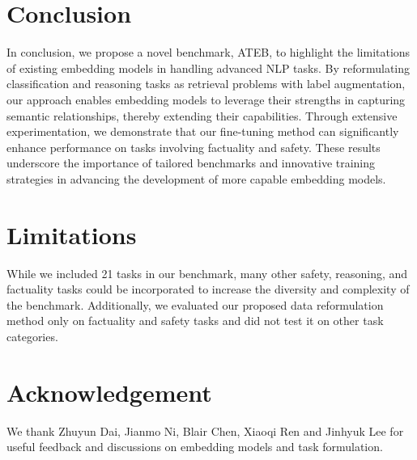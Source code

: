 
\section{Conclusion} In conclusion, we propose a novel benchmark, ATEB, to highlight the limitations of existing embedding models in handling advanced NLP tasks. By reformulating classification and reasoning tasks as retrieval problems with label augmentation, our approach enables embedding models to leverage their strengths in capturing semantic relationships, thereby extending their capabilities. Through extensive experimentation, we demonstrate that our fine-tuning method can significantly enhance performance on tasks involving factuality and safety. These results underscore the importance of tailored benchmarks and innovative training strategies in advancing the development of more capable embedding models.

\section{Limitations} While we included 21 tasks in our benchmark, many other safety, reasoning, and factuality tasks could be incorporated to increase the diversity and complexity of the benchmark. Additionally, we evaluated our proposed data reformulation method only on factuality and safety tasks and did not test it on other task categories.

\section{Acknowledgement} We thank Zhuyun Dai, Jianmo Ni, Blair Chen, Xiaoqi Ren and Jinhyuk Lee for useful feedback and discussions on embedding models and task formulation. 